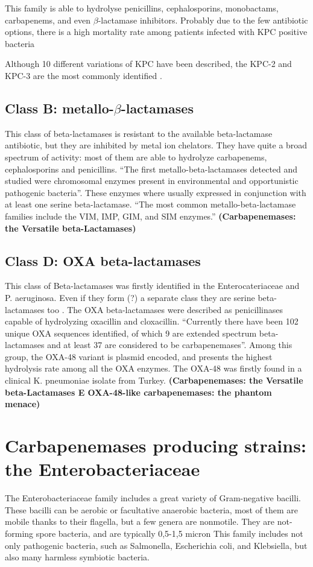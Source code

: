 \documentclass[11pt]{report}
\begin{document}
This family is able to hydrolyse penicillins, cephalosporins, monobactams, carbapenems, and even $\beta$-lactamase inhibitors. Probably due to the few antibiotic options, there is a high mortality rate among patients infected with KPC positive bacteria \cite{MunozPrice2013}
                   
Although 10 different variations of KPC have been described, the KPC-2 and KPC-3 are the most commonly identified \cite{WaltherRasmussen2007}.

\section {Class B: metallo-$\beta$-lactamases}
This class of beta-lactamases is resistant to the available beta-lactamase antibiotic, but they are inhibited by metal ion chelators.
They have quite a broad spectrum of activity: most of them are able to hydrolyze carbapenems, cephalosporins and penicillins.
“The first metallo-beta-lactamases detected and studied were chromosomal enzymes present in environmental and opportunistic pathogenic bacteria”.
These enzymes where usually expressed in conjunction with at least one serine beta-lactamase.
“The most common metallo-beta-lactamase families include the VIM, IMP, GIM, and SIM enzymes.”
\textbf{(Carbapenemases: the Versatile beta-Lactamases)}

\section{Class D: OXA beta-lactamases}
This class of Beta-lactamases was firstly identified in the Enterocateriaceae and P. aeruginosa.
Even if they form (?) a separate class they are serine beta-lactamases too .
The OXA beta-lactamases were described as penicillinases capable of hydrolyzing oxacillin and cloxacillin.
“Currently there have been 102 unique OXA sequences identified, of which 9 are extended spectrum beta-lactamases and at least 37 are considered to be carbapenemases”.
Among this group, the OXA-48 variant is plasmid encoded, and presents the highest hydrolysis rate among all the OXA enzymes.
The OXA-48 was firstly found in a clinical K. pneumoniae isolate from Turkey.
\textbf{(Carbapenemases: the Versatile beta-Lactamases E OXA-48-like carbapenemases: the phantom menace)}

\chapter{Carbapenemases producing strains: the Enterobacteriaceae}
The Enterobacteriaceae family includes a great variety of Gram-negative bacilli. These bacilli can be aerobic or facultative anaerobic bacteria, most of them are mobile thanks to their flagella, but a few genera are nonmotile. They are not-forming spore bacteria, and are typically 0,5-1,5 micron 
This family includes not only pathogenic bacteria, such as Salmonella, Escherichia coli, and Klebsiella, but also many harmless symbiotic bacteria.
\end{document}
